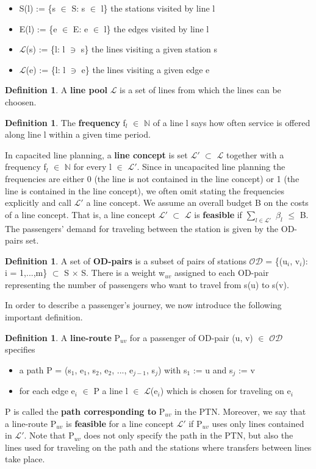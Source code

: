 \documentclass[
  twoside,
  11pt, a4paper,
  footinclude=true,
  headinclude=true,
  cleardoublepage=empty
]{book}
\theoremstyle{definition}
\newtheorem{definition}[theorem]{Definition}
\begin{document}
\begin{itemize}
\item S(l) := \{s $\in$ S: s $\in$ l\} the stations visited by line l
\item E(l) := \{e $\in$ E: e $\in$ l\} the edges visited by line l
\item $\mathcal{L}$(s) := \{l: l $\ni$ s\} the lines visiting a given station s
\item $\mathcal{L}$(e) := \{l: l $\ni$ e\} the lines visiting a given edge e
\end{itemize}
\begin{definition}
A \textbf{line pool} $\mathcal{L}$ is a set of lines from which the lines can be choosen.
\end{definition}
\begin{definition}
The \textbf{frequency} f$_l$ $\in$ $\mathbb{N}$ of a line l says how often service is offered along line l within a given time period. 
\end{definition}
In capacited line planning, a \textbf{line concept} is  set $\mathcal{L'}$ $\subset$ $\mathcal{L}$ together with a frequency f$_l$  $\in$ $\mathbb{N}$ for every l $\in$ $\mathcal{L'}$. Since in uncapacited line planning the frequencies are either 0 (the line is not contained in the line concept) or 1 (the line is contained in the line concept), we often omit stating the frequencies explicitly and call $\mathcal{L'}$ a line concept. \newline
We assume an overall budget B on the costs of a line concept. That is, a line concept $\mathcal{L'}$ $\subset$ $\mathcal{L}$ is \textbf{feasible} if $\sum_{l\in\mathcal{L'}}$ $\beta_l$ $\le$ B. \newline 
The passengers' demand for traveling between the station is given by the OD-pairs set.
\begin{definition}
A set of \textbf{OD-pairs} is a subset of pairs of stations $\mathcal{OD}$ = \{(u$_i$, v$_i$): i = 1,...,m\} $\subset$ S $\times$ S. There is a weight w$_{uv}$ assigned to each OD-pair representing the number of passengers who want to travel from s(u) to s(v).
\end{definition}
In order to describe a passenger's journey, we now introduce the following important definition.
\begin{definition}
A \textbf{line-route} P$_{uv}$ for a passenger of OD-pair (u, v) $\in$ $\mathcal{OD}$ specifies
\begin{itemize}
\item a path P = (s$_1$, e$_1$, s$_2$, e$_2$, ..., e$_{j-1}$, s$_j$) with s$_1$ := u and s$_j$ := v
\item for each edge e$_i$ $\in$ P a line l $\in$ $\mathcal{L}$(e$_i$) which is chosen for traveling on e$_i$
\end{itemize}
P is called the \textbf{path corresponding to} P$_{uv}$ in the PTN. Moreover, we say that a line-route P$_{uv}$ is \textbf{feasible} for a line concept $\mathcal{L'}$ if P$_{uv}$  uses only lines contained in $\mathcal{L'}$. Note that P$_{uv}$ does not only specify the path in the PTN, but also the lines used for traveling on the path and the stations where transfers between lines take place.
\end{definition}
\end{document}
